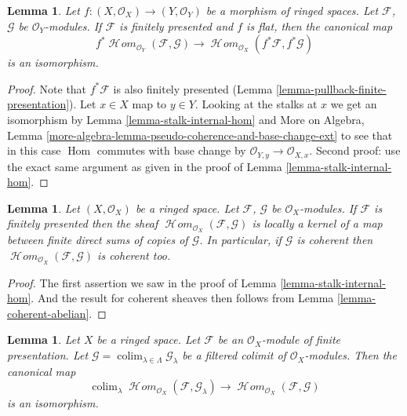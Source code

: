 \documentclass{stacks-project}
\theoremstyle{plain}
\newtheorem{lemma}[subsection]{Lemma}
\theoremstyle{definition}
\theoremstyle{remark}
\numberwithin{equation}{subsection}
\def\colim{\mathop{\mathrm{colim}}\nolimits}
\def\Hom{\mathop{\mathrm{Hom}}\nolimits}
\def\SheafHom{\mathop{\mathcal{H}\!\mathit{om}}\nolimits}
\begin{document}
\begin{lemma}
\label{lemma-pullback-internal-hom}
Let $f : (X, \mathcal{O}_X) \to (Y, \mathcal{O}_Y)$ be a morphism
of ringed spaces. Let $\mathcal{F}$, $\mathcal{G}$ be $\mathcal{O}_Y$-modules.
If $\mathcal{F}$ is finitely presented and $f$ is flat,
then the canonical map
$$
f^*\SheafHom_{\mathcal{O}_Y}(\mathcal{F}, \mathcal{G})
\longrightarrow
\SheafHom_{\mathcal{O}_X}(f^*\mathcal{F}, f^*\mathcal{G})
$$
is an isomorphism.
\end{lemma}

\begin{proof}
Note that $f^*\mathcal{F}$ is also finitely presented
(Lemma \ref{lemma-pullback-finite-presentation}).
Let $x \in X$ map to $y \in Y$. Looking at the stalks
at $x$ we get an isomorphism by
Lemma \ref{lemma-stalk-internal-hom} and
More on Algebra, Lemma
\ref{more-algebra-lemma-pseudo-coherence-and-base-change-ext}
to see that in this case $\Hom$ commutes with base change by
$\mathcal{O}_{Y, y} \to \mathcal{O}_{X, x}$.
Second proof: use the exact same argument as given
in the proof of Lemma \ref{lemma-stalk-internal-hom}.
\end{proof}

\begin{lemma}
\label{lemma-internal-hom-locally-kernel-direct-sum}
Let $(X, \mathcal{O}_X)$ be a ringed space.
Let $\mathcal{F}$, $\mathcal{G}$ be $\mathcal{O}_X$-modules.
If $\mathcal{F}$ is finitely presented then the sheaf
$\SheafHom_{\mathcal{O}_X}(\mathcal{F}, \mathcal{G})$ is
locally a kernel of a map between finite direct sums
of copies of $\mathcal{G}$.
In particular, if $\mathcal{G}$ is coherent then
$\SheafHom_{\mathcal{O}_X}(\mathcal{F}, \mathcal{G})$
is coherent too.
\end{lemma}

\begin{proof}
The first assertion
we saw in the proof of Lemma \ref{lemma-stalk-internal-hom}.
And the result for coherent sheaves then follows from
Lemma \ref{lemma-coherent-abelian}.
\end{proof}

\begin{lemma}
\label{lemma-hom-finite-presentation-colimit}
Let $X$ be a ringed space. Let $\mathcal{F}$ be an $\mathcal{O}_X$-module
of finite presentation. Let
$\mathcal{G} = \colim_{\lambda \in \Lambda} \mathcal{G}_\lambda$
be a filtered colimit of $\mathcal{O}_X$-modules. Then the canonical map
$$
\colim_\lambda \SheafHom_{\mathcal{O}_X}(\mathcal{F}, \mathcal{G}_\lambda)
\longrightarrow
\SheafHom_{\mathcal{O}_X}(\mathcal{F}, \mathcal{G})
$$
is an isomorphism.
\end{lemma}
\end{document}
